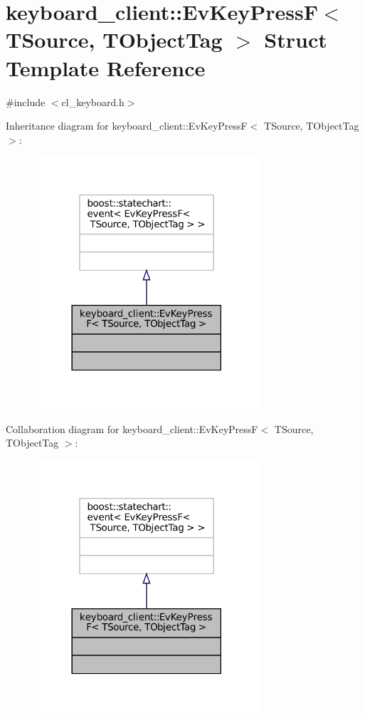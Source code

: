 \hypertarget{structkeyboard__client_1_1EvKeyPressF}{}\section{keyboard\+\_\+client\+:\+:Ev\+Key\+PressF$<$ T\+Source, T\+Object\+Tag $>$ Struct Template Reference}
\label{structkeyboard__client_1_1EvKeyPressF}


{\ttfamily \#include $<$cl\+\_\+keyboard.\+h$>$}



Inheritance diagram for keyboard\+\_\+client\+:\+:Ev\+Key\+PressF$<$ T\+Source, T\+Object\+Tag $>$\+:
\nopagebreak
\begin{figure}[H]
\begin{center}
\leavevmode
\includegraphics[width=237pt]{structkeyboard__client_1_1EvKeyPressF__inherit__graph}
\end{center}
\end{figure}


Collaboration diagram for keyboard\+\_\+client\+:\+:Ev\+Key\+PressF$<$ T\+Source, T\+Object\+Tag $>$\+:
\nopagebreak
\begin{figure}[H]
\begin{center}
\leavevmode
\includegraphics[width=237pt]{structkeyboard__client_1_1EvKeyPressF__coll__graph}
\end{center}
\end{figure}


